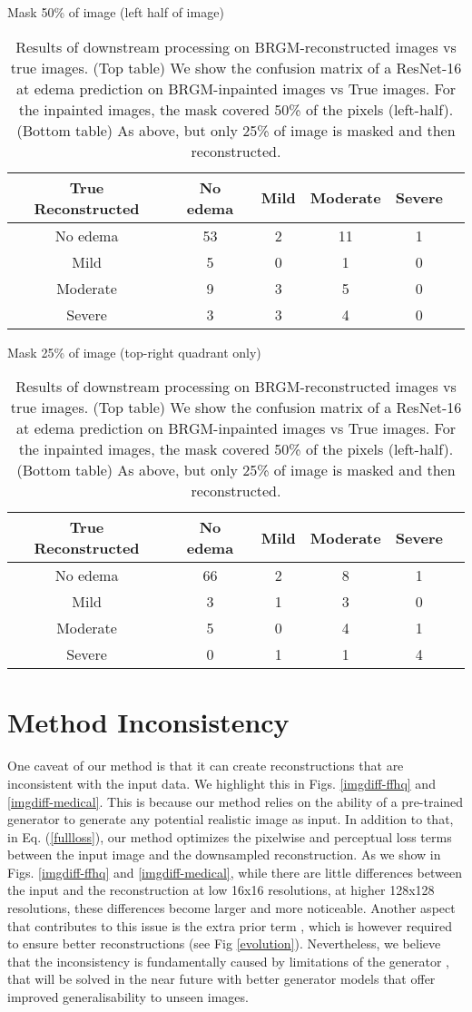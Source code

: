 \documentclass{article}
\begin{document}
\begin{table}
\centering
\renewcommand{\arraystretch}{1.5}Mask 50\% of image (left half of image)\\
\begin{tabular}{c|ccccc}
True Reconstructed & No edema	& Mild & Moderate & Severe\\
\hline
No edema & 53 & 2 & 11 & 1 \\ 
Mild & 5 & 0 & 1 & 0 \\
Moderate & 9 & 3 & 5 & 0 \\
Severe & 3 & 3 & 4 & 0 \\
\end{tabular}
\vspace{2.5em}

Mask 25\% of image (top-right quadrant only)\\
\begin{tabular}{c|ccccc}
True Reconstructed & No edema	& Mild & Moderate & Severe\\
\hline
No edema & 66 & 2 & 8 & 1\\
Mild & 3 & 1 & 3 & 0\\
Moderate & 5 & 0 & 4 & 1\\
Severe & 0 & 1 & 1 & 4\\
\end{tabular}
\caption{Results of downstream processing on BRGM-reconstructed images vs true images. (Top table) We show the confusion matrix of a ResNet-16 at edema prediction on BRGM-inpainted images vs True images. For the inpainted images, the mask covered 50\% of the pixels (left-half). (Bottom table) As above, but only 25\% of image is masked and then reconstructed. }
\label{tab:downstream}
\end{table}

\section{Method Inconsistency}
\label{inconsistency}

One caveat of our method is that it can create reconstructions that are inconsistent with the input data. We highlight this in Figs. \ref{imgdiff-ffhq} and \ref{imgdiff-medical}. This is because our method relies on the ability of a pre-trained generator to generate any potential realistic image as input. In addition to that, in Eq. (\ref{fullloss}), our method optimizes the pixelwise and perceptual loss terms between the input image and the downsampled reconstruction. As we show in Figs. \ref{imgdiff-ffhq} and \ref{imgdiff-medical}, while there are little differences between the input and the reconstruction at low 16x16 resolutions, at higher 128x128 resolutions, these differences become larger and more noticeable. Another aspect that contributes to this issue is the extra prior term , which is however required to ensure better reconstructions (see Fig \ref{evolution}). Nevertheless, we believe that the inconsistency is fundamentally caused by limitations of the generator , that will be solved in the near future with better generator models that offer improved generalisability to unseen images.
\end{document}
